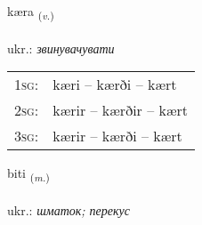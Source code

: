 \documentclass[frontgrid, backgrid]{flacards}\usepackage[]{graphicx}\usepackage[]{xcolor}
\begin{document}
\renewcommand{\flhead}{\vskip5pt \fboxsep=0pt {\small\bfseries\footnotesize Sagnorð | дієслово}}
\renewcommand{\fcfoot}{\vskip5pt \fboxsep=0pt \hspace{2pt}{\small\bfseries\footnotesize 3K}}

\renewcommand{\blhead}{\vskip5pt {\small\bfseries\footnotesize Sagnorð | дієслово }}
\renewcommand{\bcfoot}{\vskip5pt \hspace{2pt}{\small\bfseries\footnotesize 3K}}


{kæra \small{\textsubscript{(\textit{v.})}} \\[1ex] %
\textphonetic{[cʰaiːra]} \\
ukr.: \emph{звинувачувати} \\  [2ex]
\renewcommand*{\arraystretch}{0.8}
\begin{tabular}{p{1cm}l}
\textsc{1sg}: & kæri -- kærði -- kært \\ 
\textsc{2sg}: & kærir -- kærðir -- kært \\ 
\textsc{3sg}: & kærir -- kærði -- kært \\ 
\end{tabular}
}

\renewcommand{\flhead}{\vskip5pt \fboxsep=0pt {\small\bfseries\footnotesize Nafnorð | іменник}}
\renewcommand{\fcfoot}{\vskip5pt \fboxsep=0pt \hspace{2pt}{\small\bfseries\footnotesize 3K}}

\renewcommand{\blhead}{\vskip5pt {\small\bfseries\footnotesize Nafnorð | іменник }}
\renewcommand{\bcfoot}{\vskip5pt \hspace{2pt}{\small\bfseries\footnotesize 3K}}


{biti \small{\textsubscript{(\textit{m.})}} \\[1ex] %
\textphonetic{[pɪːtɪ]} \\
ukr.: \emph{шматок; перекус} \\  [2ex]
\renewcommand*{\arraystretch}{0.8}
}
\end{document}
